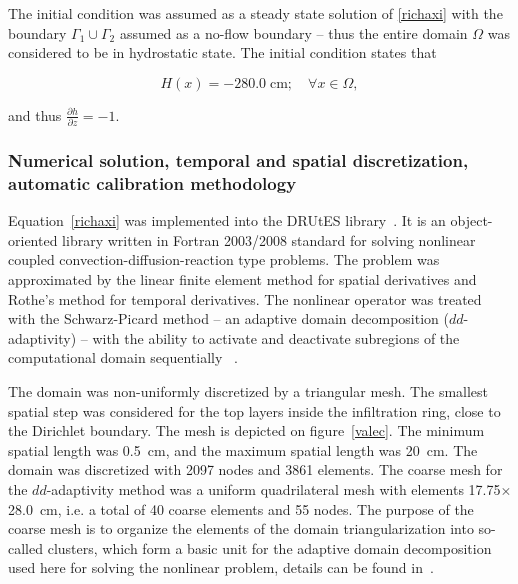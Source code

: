 \documentclass[review]{elsarticle}
\newenvironment{lineq}
    {\begin{linenomath*}
    \begin{equation}
    }
    { 
    \end{equation} 
    \end{linenomath*}
    }
\begin{document}
The initial condition was assumed as a steady state  solution  of \eqref{richaxi} with the boundary $\Gamma_1 \cup \Gamma_2$ assumed as a no-flow boundary -- thus the entire domain $\Omega$ was considered to be in hydrostatic state. The initial condition states that 
\begin{lineq}
H(x) = -280.0 \; \mbox{cm}; \quad \forall x \in \Omega,
\end{lineq}
and thus $\frac{\partial h}{\partial z} = -1$.


\subsubsection{Numerical solution, temporal and spatial discretization, automatic calibration methodology}%
\label{trapoty}

Equation~\eqref{richaxi} was implemented into the DRUtES library~\citep{drutes}. It is an object-oriented library written in Fortran 2003/2008 standard for solving nonlinear coupled convection-diffusion-reaction type problems. The problem was approximated by the linear finite element method for spatial derivatives and Rothe's method for temporal derivatives. The nonlinear operator was treated with the Schwarz-Picard method -- an adaptive domain decomposition  ($dd$-adaptivity) -- with the ability to activate and deactivate subregions of the computational domain sequentially ~\citep{mojecomp, mojejcam2, mojeamc2}.



 The domain was non-uniformly discretized by a triangular mesh. The smallest spatial step was considered for the top layers inside the infiltration ring, close to the Dirichlet boundary. The mesh is depicted on figure~\ref{valec}. The minimum spatial length was 0.5~cm, and the maximum spatial length was 20~cm. The domain was discretized with 2097 nodes and 3861 elements. The coarse mesh for the $dd$-adaptivity method was a uniform quadrilateral mesh with elements 17.75$\times$28.0~cm, i.e. a total of 40 coarse elements and 55 nodes. The purpose of the coarse mesh is to organize the elements of the domain triangularization into so-called clusters, which form a basic unit for the adaptive domain decomposition used here for solving the nonlinear problem, details can be found in~\citep{mojeamc2}.
\end{document}

